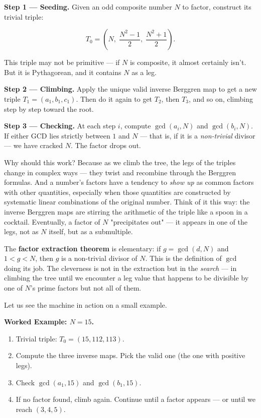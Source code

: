 \documentclass[11pt,openany]{book}
\theoremstyle{definition}
\theoremstyle{plain}
\theoremstyle{remark}
\begin{document}
\textbf{Step 1 — Seeding.} Given an odd composite number $N$ to factor, construct its trivial triple:

$$T_0 = \left(N,\;\frac{N^2 - 1}{2},\;\frac{N^2 + 1}{2}\right).$$

This triple may not be primitive — if $N$ is composite, it almost certainly isn't. But it is Pythagorean, and it contains $N$ as a leg.

\textbf{Step 2 — Climbing.} Apply the unique valid inverse Berggren map to get a new triple $T_1 = (a_1, b_1, c_1)$. Then do it again to get $T_2$, then $T_3$, and so on, climbing step by step toward the root.

\textbf{Step 3 — Checking.} At each step $i$, compute $\gcd(a_i, N)$ and $\gcd(b_i, N)$. If either GCD lies strictly between $1$ and $N$ — that is, if it is a \textit{non-trivial} divisor — we have cracked $N$. The factor drops out.

Why should this work? Because as we climb the tree, the legs of the triples change in complex ways — they twist and recombine through the Berggren formulas. And a number's factors have a tendency to \textit{show up} as common factors with other quantities, especially when those quantities are constructed by systematic linear combinations of the original number. Think of it this way: the inverse Berggren maps are stirring the arithmetic of the triple like a spoon in a cocktail. Eventually, a factor of $N$ "precipitates out" — it appears in one of the legs, not as $N$ itself, but as a submultiple.

The \textbf{factor extraction theorem} is elementary: if $g = \gcd(d, N)$ and $1 < g < N$, then $g$ is a non-trivial divisor of $N$. This is the definition of $\gcd$ doing its job. The cleverness is not in the extraction but in the \textit{search} — in climbing the tree until we encounter a leg value that happens to be divisible by one of $N$'s prime factors but not all of them.

Let us see the machine in action on a small example.

\textbf{Worked Example: $N = 15$.}

\begin{enumerate}
\item Trivial triple: $T_0 = (15, 112, 113)$.
\item Compute the three inverse maps. Pick the valid one (the one with positive legs).
\item Check $\gcd(a_1, 15)$ and $\gcd(b_1, 15)$.
\item If no factor found, climb again. Continue until a factor appears — or until we reach $(3, 4, 5)$.
\end{enumerate}
\end{document}
